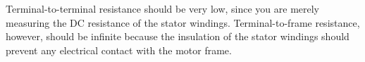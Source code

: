 





Terminal-to-terminal resistance should be very low, since you are merely measuring the DC resistance of the stator windings.  Terminal-to-frame resistance, however, should be infinite because the insulation of the stator windings should prevent any electrical contact with the motor frame.









